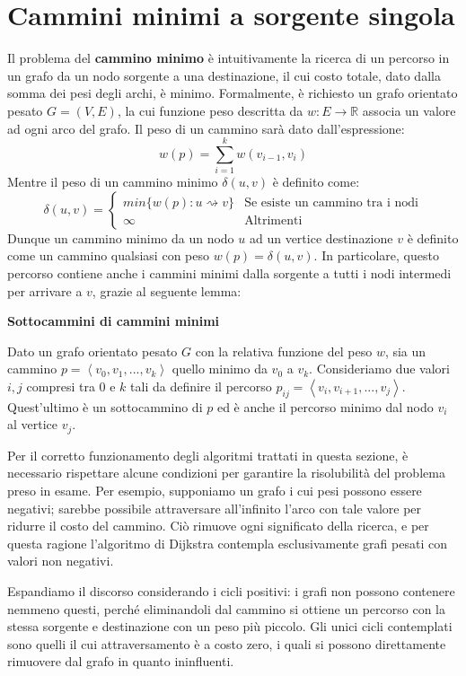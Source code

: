 \section{Cammini minimi a sorgente singola}
Il problema del \textbf{cammino minimo} è intuitivamente la ricerca di un percorso in un grafo da un nodo sorgente a una destinazione, il cui costo
totale, dato dalla somma dei pesi degli archi, è minimo. Formalmente, è richiesto un grafo orientato pesato $G = (V, E)$, la cui funzione peso descritta
da $w:E\to \mathbb{R}$ associa un valore ad ogni arco del grafo. Il peso di un cammino sarà dato dall'espressione: \[
	w(p) = \sum_{i=1}^{k} w(v_{i-1}, v_i)
\]
\noindent Mentre il peso di un cammino minimo $\delta(u, v)$ è definito come: \[
	\delta(u, v) = \begin{cases}
		min\{w(p) : u\rightsquigarrow v\} & \text{Se esiste un cammino tra i nodi}\\
		\infty & \text{Altrimenti}
	\end{cases}
\]
\noindent Dunque un cammino minimo da un nodo $u$ ad un vertice destinazione $v$ è definito come un cammino qualsiasi con peso $w(p) = \delta(u,v)$.
In particolare, questo percorso contiene anche i cammini minimi dalla sorgente a tutti i nodi intermedi per arrivare a $v$, grazie al seguente lemma:
\begin{lemma}
	\textbf{Sottocammini di cammini minimi}\par
	\noindent Dato un grafo orientato pesato $G$ con la relativa funzione del peso $w$, sia un cammino $p = \left<v_0, v_1, ..., v_k \right>$ quello
	minimo da $v_0$ a $v_k$. Consideriamo due valori $i,j$ compresi tra $0$ e $k$ tali da definire il percorso $p_{ij} = \left<v_i, v_{i+1}, ..., v_j \right>$.
	Quest'ultimo è un sottocammino di $p$ ed è anche il percorso minimo dal nodo $v_i$ al vertice $v_j$.
\end{lemma}

\noindent Per il corretto funzionamento degli algoritmi trattati in questa sezione, è necessario rispettare alcune condizioni per garantire la risolubilità
del problema preso in esame. Per esempio, supponiamo un grafo i cui pesi possono essere negativi; sarebbe possibile attraversare all'infinito l'arco con
tale valore per ridurre il costo del cammino. Ciò rimuove ogni significato della ricerca, e per questa ragione l'algoritmo di Dijkstra contempla
esclusivamente grafi pesati con valori non negativi.\par
Espandiamo il discorso considerando i cicli positivi: i grafi non possono contenere nemmeno questi, perché eliminandoli dal cammino si ottiene un
percorso con la stessa sorgente e destinazione con un peso più piccolo. Gli unici cicli contemplati sono quelli il cui attraversamento è a costo zero,
i quali si possono direttamente rimuovere dal grafo in quanto ininfluenti.\newline

